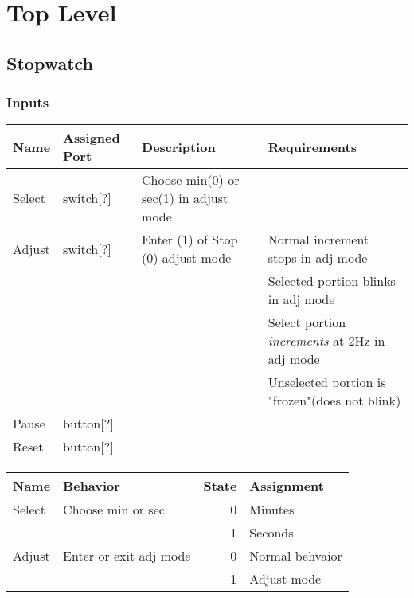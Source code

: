 \documentclass[11pt]{article}
\author{parallels}
\date{\today}
\title{}
\begin{document}
\tableofcontents

\section{Top Level}
\label{sec:orgf5511c6}

\subsection{Stopwatch}
\label{sec:org441d777}

\subsubsection{Inputs}
\label{sec:orgd2bafda}

\begin{center}
\begin{tabular}{llll}
Name & Assigned Port & Description & Requirements\\
\hline
Select & switch[?] & Choose min(0) or sec(1) in adjust mode & \\
\hline
Adjust & switch[?] & Enter (1) of Stop (0) adjust mode & Normal increment stops in adj mode\\
 &  &  & Selected portion blinks in adj mode\\
 &  &  & Select portion \emph{increments} at 2Hz in adj mode\\
 &  &  & Unselected portion is "frozen"(does not blink)\\
\hline
Pause & button[?] &  & \\
\hline
Reset & button[?] &  & \\
\hline
\end{tabular}
\end{center}

\begin{center}
\begin{tabular}{llrl}
Name & Behavior & State & Assignment\\
\hline
Select & Choose min or sec & 0 & Minutes\\
 &  & 1 & Seconds\\
\hline
Adjust & Enter or exit adj mode & 0 & Normal behvaior\\
 &  & 1 & Adjust mode\\
\hline
\end{tabular}
\end{center}
\end{document}

